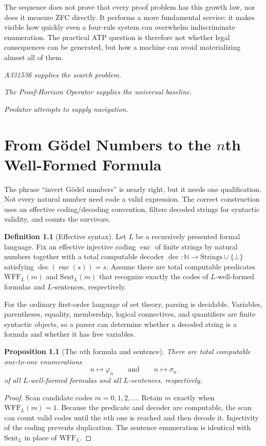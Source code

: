 \documentclass[11pt,oneside]{book}
\newtheorem{proposition}[theorem]{Proposition}
\theoremstyle{definition}
\newtheorem{definition}[theorem]{Definition}
\theoremstyle{remark}
\newcommand{\N}{\mathbb{N}}
\begin{document}
The sequence does not prove that every proof problem has this growth law, nor does it measure ZFC directly. It performs a more fundamental service: it makes visible how quickly even a four-rule system can overwhelm indiscriminate enumeration. The practical ATP question is therefore not whether legal consequences can be generated, but how a machine can avoid materializing almost all of them.

\begin{center}
\emph{A331536 supplies the search problem.}\par
\emph{The Proof-Horizon Operator supplies the universal baseline.}\par
\emph{Predator attempts to supply navigation.}
\end{center}

\chapter{From G\"odel Numbers to the $n$th Well-Formed Formula}
The phrase ``invert G\"odel numbers'' is nearly right, but it needs one qualification. Not every natural number need code a valid expression. The correct construction uses an effective coding/decoding convention, filters decoded strings for syntactic validity, and counts the survivors.

\begin{definition}[Effective syntax]\label{def:syntax}
Let $L$ be a recursively presented formal language. Fix an effective injective coding $\operatorname{enc}$ of finite strings by natural numbers together with a total computable decoder $\operatorname{dec}:\N\to \text{Strings}\cup\{\bot\}$ satisfying $\operatorname{dec}(\operatorname{enc}(s))=s$. Assume there are total computable predicates $\mathrm{WFF}_L(m)$ and $\mathrm{Sent}_L(m)$ that recognize exactly the codes of $L$-well-formed formulas and $L$-sentences, respectively.
\end{definition}

For the ordinary first-order language of set theory, parsing is decidable. Variables, parentheses, equality, membership, logical connectives, and quantifiers are finite syntactic objects, so a parser can determine whether a decoded string is a formula and whether it has free variables.

\begin{proposition}[The $n$th formula and sentence]\label{prop:nth}
There are total computable one-to-one enumerations
\[
n\longmapsto \varphi_n
\qquad\text{and}\qquad
n\longmapsto \sigma_n
\]
of all $L$-well-formed formulas and all $L$-sentences, respectively.
\end{proposition}
\begin{proof}
Scan candidate codes $m=0,1,2,\ldots$. Retain $m$ exactly when $\mathrm{WFF}_L(m)=1$. Because the predicate and decoder are computable, the scan can count valid codes until the $n$th one is reached and then decode it. Injectivity of the coding prevents duplication. The sentence enumeration is identical with $\mathrm{Sent}_L$ in place of $\mathrm{WFF}_L$.
\end{proof}
\end{document}
